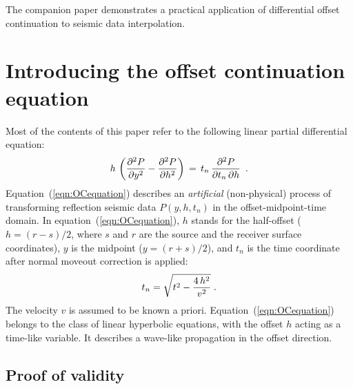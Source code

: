 The companion paper \cite[]{GEO68-02-07330744} demonstrates a
practical application of differential offset continuation to seismic
data interpolation.

\section{Introducing the offset continuation equation}
 Most of the contents of this paper refer to the following linear
partial differential equation:
\begin{equation}
h \, \left( {\partial^2 P \over \partial y^2} - {\partial^2 P \over \partial
h^2} \right) \, = \, t_n \, {\partial^2 P \over {\partial t_n \,
\partial h}} \,\,\, . 
\label{eqn:OCequation} 
\end{equation}
Equation~(\ref{eqn:OCequation}) describes an {\em artificial}
(non-physical) process of transforming reflection seismic data
$P(y,h,t_n)$ in the offset-midpoint-time domain. In
equation~(\ref{eqn:OCequation}), $h$ stands for the half-offset
($h=(r-s)/2$, where $s$ and $r$ are the source and the receiver
surface coordinates), $y$ is the midpoint ($y=(r+s)/2$), and $t_n$ is the time
coordinate after normal moveout correction is applied:
\begin{equation}
\label{eqn:tnmo}
t_n=\sqrt{t^2-{4 \, h^2 \over v^2}}\;.
\end{equation}
The velocity $v$ is assumed to be known a priori.
Equation~(\ref{eqn:OCequation}) belongs to the class of linear
hyperbolic equations, with the offset $h$ acting as a time-like
variable. It describes a wave-like propagation in the offset
direction.

\subsection{Proof of validity}

